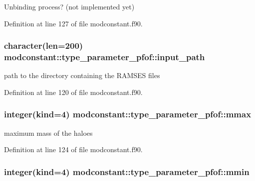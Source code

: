 Unbinding process? (not implemented yet) 



Definition at line 127 of file modconstant.\-f90.

\hypertarget{structmodconstant_1_1type__parameter__pfof_a4ec6b9cf9beb861220a74b20d513dc99}{
\subsubsection[{input\-\_\-path}]{\setlength{\rightskip}{0pt plus 5cm}character(len=200) modconstant\-::type\-\_\-parameter\-\_\-pfof\-::input\-\_\-path}}\label{structmodconstant_1_1type__parameter__pfof_a4ec6b9cf9beb861220a74b20d513dc99}


path to the directory containing the R\-A\-M\-S\-E\-S files 



Definition at line 120 of file modconstant.\-f90.

\hypertarget{structmodconstant_1_1type__parameter__pfof_a1140f2035cbceedd46862b69e347edf2}{
\subsubsection[{mmax}]{\setlength{\rightskip}{0pt plus 5cm}integer(kind=4) modconstant\-::type\-\_\-parameter\-\_\-pfof\-::mmax}}\label{structmodconstant_1_1type__parameter__pfof_a1140f2035cbceedd46862b69e347edf2}


maximum mass of the haloes 



Definition at line 124 of file modconstant.\-f90.

\hypertarget{structmodconstant_1_1type__parameter__pfof_ac284b2b966517e18568a1410337b8bc5}{
\subsubsection[{mmin}]{\setlength{\rightskip}{0pt plus 5cm}integer(kind=4) modconstant\-::type\-\_\-parameter\-\_\-pfof\-::mmin}}\label{structmodconstant_1_1type__parameter__pfof_ac284b2b966517e18568a1410337b8bc5}


